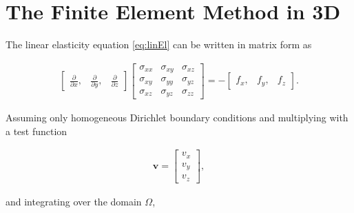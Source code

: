\section{The Finite Element Method in 3D}

The linear elasticity equation \eqref{eq:linEl} can be written in matrix form as

\begin{align*}
\begin{bmatrix}
\frac{\partial}{\partial x}, & \frac{\partial}{\partial y}, & \frac{\partial}{\partial z}
\end{bmatrix}
\begin{bmatrix}
\sigma_{xx} & \sigma_{xy} & \sigma_{xz} \\
\sigma_{xy} & \sigma_{yy} & \sigma_{yz} \\
\sigma_{xz} & \sigma_{yz} & \sigma_{zz}
\end{bmatrix} = -
\begin{bmatrix}
f_x, & f_y, & f_z 
\end{bmatrix}.
\end{align*}

Assuming only homogeneous Dirichlet boundary conditions and multiplying with a test function 

\begin{align*}
\bm{v} = 
\begin{bmatrix}
v_x \\
v_y \\
v_z 
\end{bmatrix},
\end{align*}

and integrating over the domain $\Omega$, 